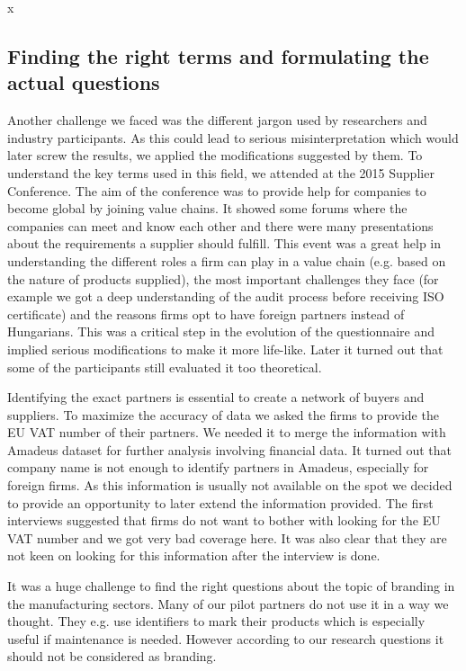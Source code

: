 x\documentclass[final, dvipsnames, authoryear,12pt]{elsarticle}
\begin{document}
\subsection{Finding the right terms and formulating the actual questions}

Another challenge we faced was the different jargon used by researchers and industry participants. As this could lead to serious misinterpretation which would later screw the results, we applied the modifications suggested by them. To understand the key terms used in this field, we attended at the 2015 Supplier Conference. The aim of the conference was to provide help for companies to become global by joining value chains. It showed some forums where the companies can meet and know each other and there were many presentations about the requirements a supplier should fulfill. This event was a great help in understanding the different roles a firm can play in a value chain (e.g. based on the nature of products supplied), the most important challenges they face (for example we got a deep understanding of the audit process before receiving ISO certificate) and the reasons firms opt to have foreign partners instead of Hungarians. This was a critical step in the evolution of the questionnaire and implied serious modifications to make it more life-like. Later it turned out that some of the participants still evaluated it too theoretical.

Identifying the exact partners is essential to create a network of buyers and suppliers. To maximize the accuracy of data we asked the firms to provide the EU VAT number of their partners. We needed it to merge the information with Amadeus dataset for further analysis involving financial data. It turned out that company name is not enough to identify partners in Amadeus, especially for foreign firms. As this information is usually not available on the spot we decided to provide an opportunity to later extend the information provided. The first interviews suggested that firms do not want to bother with looking for the EU VAT number and we got very bad coverage here. It was also clear that they are not keen on looking for this information after the interview is done.

It was a huge challenge to find the right questions about the topic of branding in the manufacturing sectors. Many of our pilot partners do not use it in a way we thought. They e.g. use identifiers to mark their products which is especially useful if maintenance is needed. However according to our research questions it should not be considered as branding.
\end{document}
